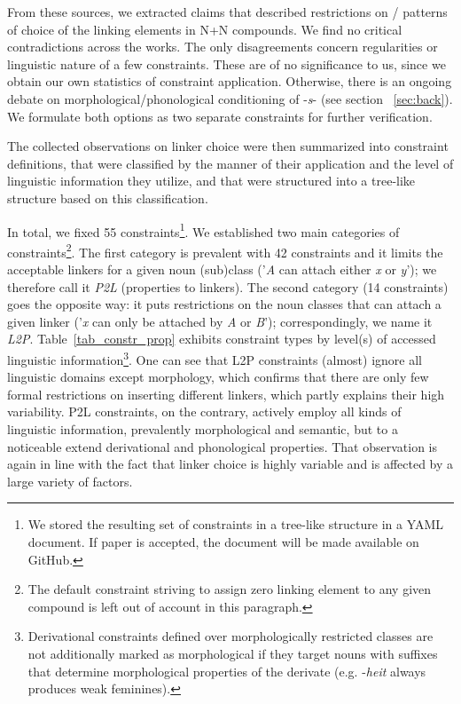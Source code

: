 \documentclass[10pt, a4paper]{article}
\begin{document}
From these sources, we extracted claims that described restrictions on / patterns of choice of the linking elements in N+N compounds. We find no critical contradictions across the works. The only disagreements concern regularities or linguistic nature of a few constraints. These are of no significance to us, since we obtain our own statistics of constraint application. Otherwise, there is an ongoing debate on morphological/phonological conditioning of -\textit{s}- (see section ~\ref{sec:back}). We formulate both options as two separate constraints for further verification.

The collected observations on linker choice were then summarized into constraint definitions, that were classified by the manner of their application and the level of linguistic information they utilize, and that were structured into a tree-like structure based on this classification.

In total, we fixed 55 constraints\footnote{We stored the resulting set of constraints in a tree-like structure in a YAML document. If paper is accepted, the document will be made available on GitHub.}. We established two main categories of constraints\footnote{The default constraint striving to assign zero linking element to any given compound is left out of account in this paragraph.}. The first category is prevalent with 42 constraints and it limits the acceptable linkers for a given noun (sub)class ('\textit{A} can attach either \textit{x} or \textit{y}'); we therefore call it \textit{P2L} (properties to linkers). The second category (14 constraints) goes the opposite way: it puts restrictions on the noun classes that can attach a given linker ('\textit{x} can only be attached by \textit{A} or \textit{B}'); correspondingly, we name it \textit{L2P}. Table~\ref{tab_constr_prop} exhibits constraint types by level(s) of accessed linguistic information\footnote{Derivational constraints defined over morphologically restricted classes are not additionally marked as morphological if they target nouns with suffixes that determine morphological properties of the derivate (e.g. -\textit{heit} always produces weak feminines).}. One can see that L2P constraints (almost) ignore all linguistic domains except morphology, which confirms that there are only few formal restrictions on inserting different linkers, which partly explains their high variability. P2L constraints, on the contrary, actively employ all kinds of linguistic information, prevalently morphological and semantic, but to a noticeable extend derivational and phonological properties. That observation is again in line with the fact that linker choice is highly variable and is affected by a large variety of factors.
\end{document}
